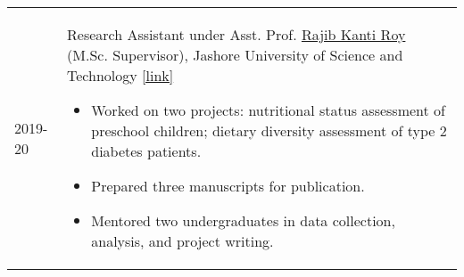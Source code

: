 
\begin{longtable}[l]{@{}p{} p{}}
    2019-20 & Research Assistant under Asst. Prof. \href{https://just.edu.bd/t/teacher-1549448214343}{Rajib Kanti Roy} (M.Sc. Supervisor), Jashore University of Science and Technology \href{https://1drv.ms/b/c/919fe16e04062443/EUMkBgRu4Z8ggJGJYAAAAAABTrgzcQmgxLyzuh6e_xyYNQ?e=mmSRTM}{[link]}
    \setlength{\leftmargini}{1em}
    \begin{itemize}
    \item Worked on two projects: nutritional status assessment of preschool children; dietary diversity assessment of type 2 diabetes patients.
    \item Prepared three manuscripts for publication. 
    \item Mentored two undergraduates in data collection, analysis, and project writing. 
    \end{itemize}
    
\end{longtable}